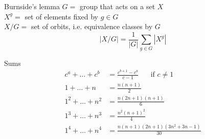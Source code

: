\begin{misc}{Burnside's lemma}
	$G =$ group that acts on a set $X$ \\
	$X^g =$ set of elements fixed by $g \in G$ \\
	$X/G =$ set of orbits, i.e. equivalence classes by $G$
	\begin{equation*}
		|X/G| = \frac{1}{|G|} \sum_{g \in G} |X^g|
	\end{equation*}
\end{misc}

\begin{misc}{Sums}
	\begin{align*}
		c^a + \ldots + c^b &= \frac{c^{b+1} - c^a}{c-1} \text{~~~~~if } c \neq 1 \\
		1 + \ldots + n &= \frac{n(n+1)}{2} \\
		1^2 + \ldots + n^2 &= \frac{n(2n+1)(n+1)}{6} \\
		1^3 + \ldots + n^3 &= \frac{n^2(n+1)^2}{4} \\
		1^4 + \ldots + n^4 &= \frac{n(n+1)(2n+1)(3n^2+3n-1)}{30} \\
	\end{align*}
\end{misc}


